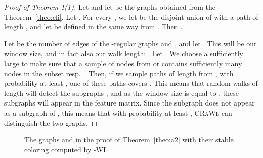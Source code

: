 \documentclass{scrartcl} \usepackage[dvipsnames]{xcolor}
\newcommand{\crawl}{\textsc{CRaWl}}
\begin{document}
\begin{proof}[Proof of Theorem 1(1)]
  Let  and let  be
the graphs obtained from the Theorem~\ref{theo:cfi}. Let
. For every , we let  be the
disjoint union of  with a path of length , and let 
be defined in the same way from . Then .

  Let  be the number of edges of the -regular
graphs  and , and let . This
will be our window size, and in fact also our walk length: 
. Let . We choose a sufficiently large
 to make sure that a sample of  nodes from 
or  contains sufficiently many nodes in the subset
 resp.\ . Then, if we
sample  paths of length  from , with probability at
least , one of these paths covers . This means that  random walks of length 
will detect the subgraphs , and as the window size  is
equal to , these subgraphs will appear in the feature
matrix. Since the subgraph  does not appear as a subgraph of
, this means that with probability at least ,
\crawl{} can distinguish the two graphs.
\end{proof}

\begin{figure}
  \centering
  \caption{The graphs  and  in the proof of
    Theorem~\ref{theo:a2} with their stable coloring computed by -WL}
  \label{fig:3paths}
\end{figure}
\end{document}
